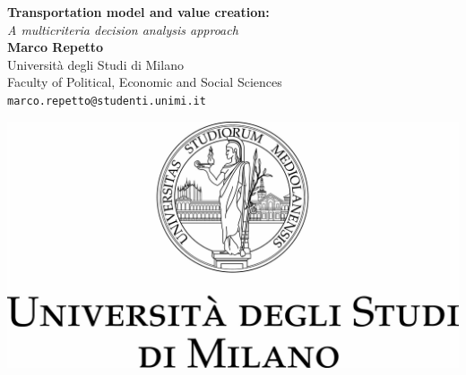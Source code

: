 \documentclass[a0,portrait]{a0poster}
\begin{document}
\begin{minipage}[b]{0.75\linewidth}
\veryHuge \textbf{Transportation model and value
creation:} \color{Black}\\ %
\Huge\textit{ A multicriteria decision
analysis approach}\\[2cm] %
\huge \textbf{Marco Repetto}\\[0.5cm] %
\huge Università degli Studi di Milano\\[0.4cm] %
\Large Faculty of Political, Economic and Social Sciences\\[0.4cm]
\Large \texttt{marco.repetto@studenti.unimi.it}\\
\end{minipage}
%
\begin{minipage}[b]{0.25\linewidth}
\includegraphics[width=20cm]{logo}\\
\end{minipage}

\vspace{1cm} %
\end{document}
